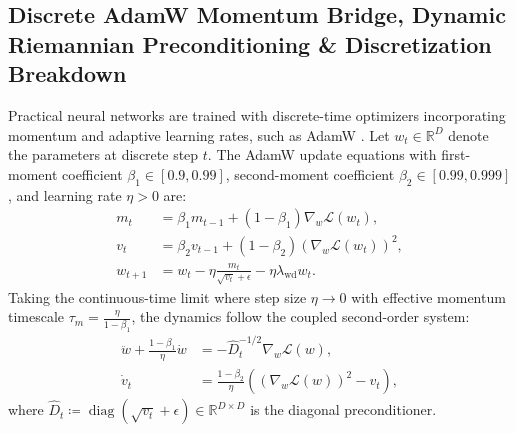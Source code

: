\documentclass{article}
\theoremstyle{plain}
\theoremstyle{definition}
\DeclareMathOperator{\diag}{diag}
\begin{document}
\subsection{Discrete AdamW Momentum Bridge, Dynamic Riemannian Preconditioning \& Discretization Breakdown}
\label{sec:app_adamw_bridge}
Practical neural networks are trained with discrete-time optimizers incorporating momentum and adaptive learning rates, such as AdamW \citep{Loshchilov2019Decoupled}. Let $w_t \in \mathbb{R}^D$ denote the parameters at discrete step $t$. The AdamW update equations with first-moment coefficient $\beta_1 \in [0.9, 0.99]$, second-moment coefficient $\beta_2 \in [0.99, 0.999]$, and learning rate $\eta > 0$ are:
\begin{align}
    m_t &= \beta_1 m_{t-1} + (1 - \beta_1) \nabla_w \mathcal{L}(w_t), \\
    v_t &= \beta_2 v_{t-1} + (1 - \beta_2) (\nabla_w \mathcal{L}(w_t))^2, \\
    w_{t+1} &= w_t - \eta \frac{m_t}{\sqrt{v_t} + \epsilon} - \eta \lambda_{\text{wd}} w_t.
\end{align}
Taking the continuous-time limit where step size $\eta \to 0$ with effective momentum timescale $\tau_m = \frac{\eta}{1 - \beta_1}$, the dynamics follow the coupled second-order system:
\begin{align}
    \ddot{w} + \frac{1 - \beta_1}{\eta} \dot{w} &= -\hat{D}_t^{-1/2} \nabla_w \mathcal{L}(w), \label{eq:underdamped_adamw} \\
    \dot{v}_t &= \frac{1 - \beta_2}{\eta} \left( (\nabla_w \mathcal{L}(w))^2 - v_t \right),
\end{align}
where $\hat{D}_t \coloneqq \diag(\sqrt{v_t} + \epsilon) \in \mathbb{R}^{D \times D}$ is the diagonal preconditioner.
\end{document}
